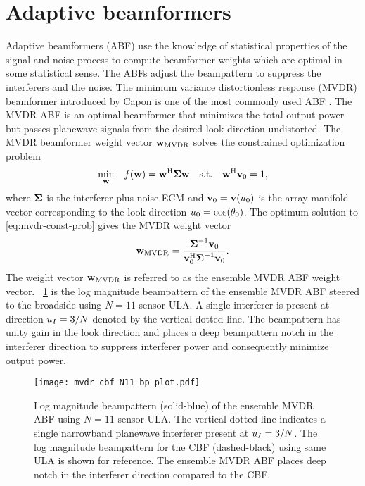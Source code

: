 
\section{Adaptive beamformers}
\label{sec:abf}
Adaptive beamformers (ABF) use the knowledge of statistical properties
of the signal and noise process to compute beamformer weights which
are optimal in some statistical sense. The ABFs adjust the beampattern
to suppress the interferers and the noise. The minimum variance
distortionless response (MVDR) beamformer introduced by Capon is one
of the most commonly used ABF \cite{capon1969mvdr}. The MVDR ABF is an
optimal beamformer that minimizes the total output power but
passes planewave signals from the desired look direction
undistorted. The MVDR beamformer weight vector ${\bf w}_{\rm MVDR}$ solves the
constrained optimization problem
\begin{equation}
  \label{eq:mvdr-const-prob}
  \underset{{\bf w}}\min \quad f({\bf w}) = 
{\bf w}^{\rm H}\boldsymbol{\Sigma}{\bf w} \quad \text{s.t.} \quad {\bf w}^{\rm H}{\bf v}_0 = 1,
\end{equation}
where $\boldsymbol{\Sigma}$ is the interferer-plus-noise ECM and
${\bf v}_0 = {\bf v}(u_0)$ is the array manifold vector corresponding
to the look direction $u_0 = \cos(\theta_0)$. The optimum solution
to \eqref{eq:mvdr-const-prob} gives the MVDR weight vector
\begin{equation}
  \label{eq:mvdr-wt} 
{\bf w}_{\rm MVDR} =
\frac{\boldsymbol{\Sigma}^{-1}{\bf v}_0}{{\bf v}_0^{\rm H}\boldsymbol{\Sigma}^{-1}{\bf v}_0}.
\end{equation}
The weight vector ${\bf w}_{\rm MVDR}$ is referred to as the ensemble MVDR ABF
weight vector. \figurename{}~\ref{fig:mvdr-beampattern} is the log
magnitude beampattern of the ensemble MVDR ABF steered to the
broadside using $N = 11$ sensor ULA. A single interferer is present at
direction $u_I = 3/N$ denoted by the vertical dotted line. The
beampattern has unity gain in the look direction and places a deep
beampattern notch in the interferer direction to suppress interferer
power and consequently minimize output power.


\begin{figure}[!hp]
 \centering
    \texttt{[image: mvdr\_cbf\_N11\_bp\_plot.pdf]}
    \caption[Ensemble MVDR ABF beampattern using $N=11$ sensor ULA]{Log magnitude beampattern (solid-blue) of the ensemble MVDR ABF using $N = 11$ sensor ULA. The vertical dotted line indicates a single narrowband planewave interferer present at $u_I = 3/N$. The log magnitude beampattern for the CBF (dashed-black) using same ULA is shown for reference. The ensemble MVDR ABF places deep notch in the interferer direction compared to the CBF.} 
    \label{fig:mvdr-beampattern}
\end{figure}

